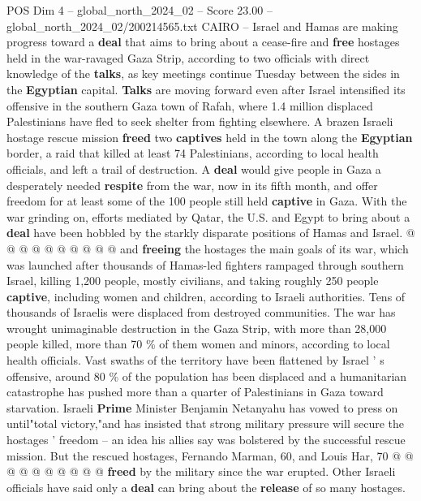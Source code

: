 \begin{textsample}{POS Dim 4 – global\_north\_2024\_02 – Score 23.00 – global\_north\_2024\_02/200214565.txt}  \label{ex:f4_pos_180}
CAIRO -- Israel and Hamas are making progress toward a \textbf{deal} that aims to bring about a cease-fire and \textbf{free} hostages held in the war-ravaged Gaza Strip, according to two officials with direct knowledge of the \textbf{talks}, as key meetings continue Tuesday between the sides in the \textbf{Egyptian} capital. \textbf{Talks} are moving forward even after Israel intensified its offensive in the southern Gaza town of Rafah, where 1.4 million displaced Palestinians have fled to seek shelter from fighting elsewhere.
A brazen Israeli hostage rescue mission \textbf{freed} two \textbf{captives} held in the town along the \textbf{Egyptian} border, a raid that killed at least 74 Palestinians, according to local health officials, and left a trail of destruction.
A \textbf{deal} would give people in Gaza a desperately needed \textbf{respite} from the war, now in its fifth month, and offer freedom for at least some of the 100 people still held \textbf{captive} in Gaza.
With the war grinding on, efforts mediated by Qatar, the U.S. and Egypt to bring about a \textbf{deal} have been hobbled by the starkly disparate positions of Hamas and Israel. @ @ @ @ @ @ @ @ @ @ and \textbf{freeing} the hostages the main goals of its war, which was launched after thousands of Hamas-led fighters rampaged through southern Israel, killing 1,200 people, mostly civilians, and taking roughly 250 people \textbf{captive}, including women and children, according to Israeli authorities.
Tens of thousands of Israelis were displaced from destroyed communities.
The war has wrought unimaginable destruction in the Gaza Strip, with more than 28,000 people killed, more than 70 \% of them women and minors, according to local health officials.
Vast swaths of the territory have been flattened by Israel ' s offensive, around 80 \% of the population has been displaced and a humanitarian catastrophe has pushed more than a quarter of Palestinians in Gaza toward starvation.
Israeli \textbf{Prime} Minister Benjamin Netanyahu has vowed to press on until"total victory,"and has insisted that strong military pressure will secure the hostages ' freedom -- an idea his allies say was bolstered by the successful rescue mission.
But the rescued hostages, Fernando Marman, 60, and Louis Har, 70 @ @ @ @ @ @ @ @ @ @ \textbf{freed} by the military since the war erupted.
Other Israeli officials have said only a \textbf{deal} can bring about the \textbf{release} of so many hostages.

\end{textsample}

